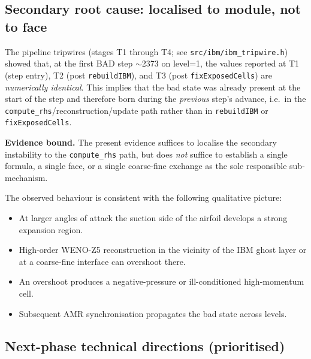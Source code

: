 \subsection{Secondary root cause: localised to module, not to face}

The pipeline tripwires (stages T1 through T4; see
\texttt{src/ibm/ibm\_tripwire.h}) showed that, at the first BAD step
$\sim$2373 on level=1, the values reported at T1 (step entry), T2 (post
\texttt{rebuildIBM}), and T3 (post \texttt{fixExposedCells}) are
\emph{numerically identical}. This implies that the bad state was already
present at the start of the step and therefore born during the
\emph{previous} step's advance, i.e.\ in the
\texttt{compute\_rhs}/reconstruction/update path rather than in
\texttt{rebuildIBM} or \texttt{fixExposedCells}.

\textbf{Evidence bound.} The present evidence suffices to localise the
secondary instability to the \texttt{compute\_rhs} path, but does \emph{not}
suffice to establish a single formula, a single face, or a single
coarse-fine exchange as the sole responsible sub-mechanism.

The observed behaviour is consistent with the following qualitative
picture:
\begin{itemize}
  \item At larger angles of attack the suction side of the airfoil develops
        a strong expansion region.
  \item High-order WENO-Z5 reconstruction in the vicinity of the IBM ghost
        layer or at a coarse-fine interface can overshoot there.
  \item An overshoot produces a negative-pressure or ill-conditioned
        high-momentum cell.
  \item Subsequent AMR synchronisation propagates the bad state across
        levels.
\end{itemize}

\subsection{Next-phase technical directions (prioritised)}

